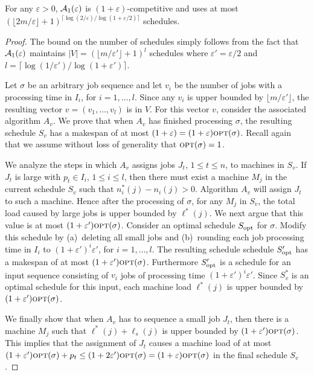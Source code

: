 \documentclass{llncs}
\newcommand{\OPT}{\text{{\sc opt}}}
\newcommand{\opt}{\OPT}
\newcommand{\eps}{\varepsilon}
\begin{document}
\begin{theorem}\label{th:guess2}
For any $\eps> 0$, ${\cal A}_1(\eps)$ is $(1+\eps)$-competitive and uses at most $(\lfloor 2m/\eps\rfloor +1)^{\lceil \log(2/\eps) / \log(1+\eps/2) \rceil }$ schedules.
\end{theorem}
\begin{proof}
The bound on the number of schedules simply follows from the fact that ${\cal A}_1(\eps)$ maintains
$|V|= (\lfloor m/\eps' \rfloor +1)^l$ schedules where $\eps'= \eps/2$ and 
$l={\lceil \log(1/\eps') / \log(1+\eps') \rceil}$.

Let $\sigma$ be an arbitrary job sequence and let $v_i$ be the number of jobs with a processing time in 
$I_i$, for $i=1, \ldots, l$. Since any $v_i$ is upper bounded by $\lfloor m/\eps' \rfloor$, the resulting
vector $v = (v_1, \ldots, v_l)$ is in $V$. For this vector $v$, consider the associated algorithm $A_v$.
We prove that when $A_v$ has finished processing $\sigma$, the resulting schedule $S_v$ has a makespan
of at most $(1+\eps) = (1+\eps)\opt(\sigma)$. Recall again that we assume without loss of generality
that $\opt(\sigma)=1$.

We analyze the steps in which $A_v$ assigns jobs $J_t$, $1\leq t\leq n$, to machines in $S_v$. If $J_t$ is
large with $p_t\in I_i$, $1\leq i\leq l$, then there must exist a machine $M_j$ in the current schedule
$S_v$ such that $n_i^*(j) - n_i(j)>0$. Algorithm $A_v$ will assign $J_t$ to such a machine. Hence after
the processing of $\sigma$, for any $M_j$ in $S_v$, the total load caused by large jobs is upper bounded
by $\ell^*(j)$. We next argue that this value is at most $(1+\eps')\opt(\sigma)$. Consider an optimal
schedule $S_{\rm opt}$ for $\sigma$. Modify this schedule by (a)~deleting all small jobs and (b)~rounding
each job processing time in $I_i$ to $(1+\eps')^i\eps'$, for $i=1,\ldots, l$. The resulting schedule 
schedule $S'_{\rm opt}$ has a makespan of at most $(1+\eps')\opt(\sigma)$. Furthermore $S'_{\rm opt}$ is
a schedule for an input sequence consisting of $v_i$ jobs of processing time $(1+\eps')^i\eps'$. Since
$S^*_v$ is an optimal schedule for this input, each machine load $\ell^*(j)$ is upper bounded by 
$(1+\eps')\opt(\sigma)$.

We finally show that when $A_v$ has to sequence a small job $J_t$, then there is a machine $M_j$ 
such that $\ell^*(j) + \ell_s(j)$ is upper bounded by $(1+\eps')\opt(\sigma)$. This implies that the
assignment of $J_t$ causes a machine load of at most $(1+\eps')\opt(\sigma) +p_t \leq (1+2\eps')\opt(\sigma) =
(1+ \eps)\opt(\sigma)$ in the final schedule $S_v$. 


\end{proof}
\end{document}
